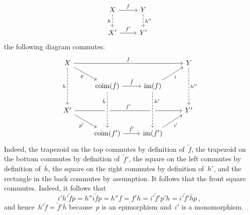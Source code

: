 \begin{remark*}
\begin{enumerate}
\[\begin{tikzcd}
            X
            \arrow{r}[above]{f}
            \arrow[dashed]{d}[left]{h}
          & Y
            \arrow[dashed]{d}[right]{h''}
          \\
            X'
            \arrow{r}[above]{f'}
          & Y'
        \end{tikzcd}
      \]
      the following diagram commutes:
      \[
        \begin{tikzcd}
            X
            \arrow{rrr}[above]{f}
            \arrow{dr}[below left]{p}
            \arrow[dashed]{dd}[left]{h}
          & {}
          & {}
          & Y
            \arrow[dashed]{dd}[right]{h''}
          \\
            {}
          & \coim(f)
            \arrow{r}[above]{\tilde{f}}
          & \im(f)
            \arrow{ur}[below right]{i}
          & {}
          \\
            X'
            \arrow{rrr}[above]{f'}
            \arrow{dr}[below left]{p'}
          & {}
          & {}
          & Y'
          \\
            {}
          & \coim(f')
            \arrow[from=uu, dashed, crossing over, "\bar{h}", swap, near start]
            \arrow{r}[above]{\tilde{f}'}
          & \im(f')
            \arrow[from=uu, dashed, crossing over, "h'", right, near start]
            \arrow{ur}[below right]{i'}
          & {}
        \end{tikzcd}
      \]
      Indeed, the trapezoid on the top commutes by definition of~$\tilde{f}$, the trapezoid on the bottom commutes by definition of~$\tilde{f}'$, the square on the left commutes by definition of~$\bar{h}$, the square on the right commutes by definition of~$h'$, and the rectangle in the back commutes by assumption.
      It follows that the front square commutes.
      Indeed, it follows that
      \[
          i' h' \tilde{f} p
        = h'' i \tilde{f} p
        = h'' f
        = f' h
        = i' \tilde{f}' p' h
        = i' \tilde{f}' \bar{h} p \,,
      \]
      and hence~$h' \tilde{f} = \tilde{f}' \bar{h}$ because~$p$ is an epimorphism and~$i'$ is a monomorphism.
      

\end{enumerate}
\end{remark*}
